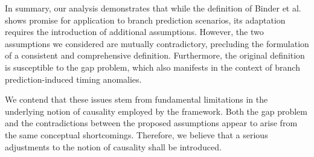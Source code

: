 In summary, our analysis demonstrates that while the definition of Binder et al. shows promise for application to branch prediction scenarios, its adaptation requires the introduction of additional assumptions. However, the two assumptions we considered are mutually contradictory, precluding the formulation of a consistent and comprehensive definition. Furthermore, the original definition is susceptible to the gap problem, which also manifests in the context of branch prediction-induced timing anomalies.

We contend that these issues stem from fundamental limitations in the underlying notion of causality employed by the framework. Both the gap problem and the contradictions between the proposed assumptions appear to arise from the same conceptual shortcomings. Therefore, we believe that a serious adjustments to the notion of causality shall be introduced.





